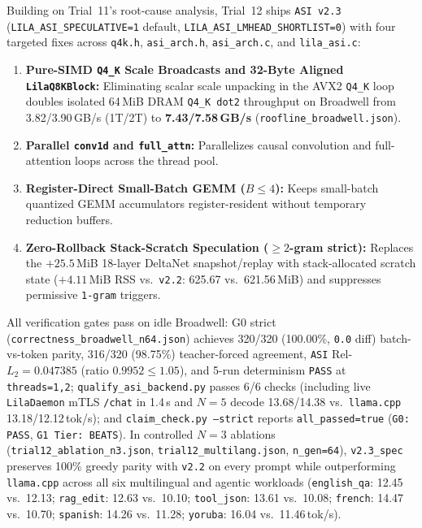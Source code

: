 \documentclass[11pt,a4paper]{article}
\begin{document}
Building on Trial~11's root-cause analysis, Trial~12 ships \texttt{ASI v2.3} (\texttt{LILA\_ASI\_SPECULATIVE=1} default, \texttt{LILA\_ASI\_LMHEAD\_SHORTLIST=0}) with four targeted fixes across \texttt{q4k.h}, \texttt{asi\_arch.h}, \texttt{asi\_arch.c}, and \texttt{lila\_asi.c}:
\begin{enumerate}
    \item \textbf{Pure-SIMD \texttt{Q4\_K} Scale Broadcasts and 32-Byte Aligned \texttt{LilaQ8KBlock}:} Eliminating scalar scale unpacking in the AVX2 \texttt{Q4\_K} loop doubles isolated 64\,MiB DRAM \texttt{Q4\_K dot2} throughput on Broadwell from 3.82/3.90\,GB/s (1T/2T) to \textbf{7.43/7.58\,GB/s} (\texttt{roofline\_broadwell.json}).
    \item \textbf{Parallel \texttt{conv1d} and \texttt{full\_attn}:} Parallelizes causal convolution and full-attention loops across the thread pool.
    \item \textbf{Register-Direct Small-Batch GEMM ($B \le 4$):} Keeps small-batch quantized GEMM accumulators register-resident without temporary reduction buffers.
    \item \textbf{Zero-Rollback Stack-Scratch Speculation ($\ge 2$-gram strict):} Replaces the $+25.5$\,MiB 18-layer DeltaNet snapshot/replay with stack-allocated scratch state ($+4.11$\,MiB RSS vs.\ \texttt{v2.2}: 625.67 vs.\ 621.56\,MiB) and suppresses permissive \texttt{1-gram} triggers.
\end{enumerate}

All verification gates pass on idle Broadwell: G0 strict (\texttt{correctness\_broadwell\_n64.json}) achieves 320/320 (100.00\%, \texttt{0.0} diff) batch-vs-token parity, 316/320 (98.75\%) teacher-forced agreement, \texttt{ASI} Rel-$L_2 = 0.047385$ (ratio $0.9952 \le 1.05$), and 5-run determinism \texttt{PASS} at \texttt{threads=1,2}; \texttt{qualify\_asi\_backend.py} passes 6/6 checks (including live \texttt{LilaDaemon} mTLS \texttt{/chat} in 1.4\,s and $N=5$ decode 13.68/14.38 vs.\ \texttt{llama.cpp} 13.18/12.12\,tok/s); and \texttt{claim\_check.py --strict} reports \texttt{all\_passed=true} (\texttt{G0: PASS}, \texttt{G1 Tier: BEATS}). In controlled $N=3$ ablations (\texttt{trial12\_ablation\_n3.json}, \texttt{trial12\_multilang.json}, \texttt{n\_gen=64}), \texttt{v2.3\_spec} preserves 100\% greedy parity with \texttt{v2.2} on every prompt while outperforming \texttt{llama.cpp} across all six multilingual and agentic workloads (\texttt{english\_qa}: 12.45 vs.\ 12.13; \texttt{rag\_edit}: 12.63 vs.\ 10.10; \texttt{tool\_json}: 13.61 vs.\ 10.08; \texttt{french}: 14.47 vs.\ 10.70; \texttt{spanish}: 14.26 vs.\ 11.28; \texttt{yoruba}: 16.04 vs.\ 11.46\,tok/s).
\end{document}
